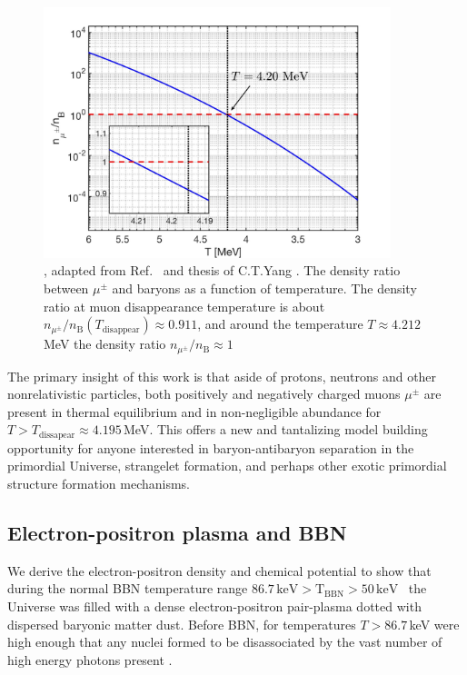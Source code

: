 \begin{figure}
\centerline{\includegraphics[width=0.9\textwidth]{./plots/DensityRatio_new2.jpg}}
\caption{, adapted from Ref.~\cite{Rafelski:2021aey} and thesis of C.T.Yang \cite{Yang:2024ret}.
The density ratio between $\mu^\pm$ and baryons as a function of temperature. The density ratio at muon disappearance temperature is about $n_{\mu^\pm}/n_\mathrm{B}(T_\mathrm{disappear})\approx0.911$, and around the temperature $T\approx4.212$ MeV the density ratio $n_{\mu^\pm}/n_\mathrm{B}\approx1$}
\label{fig:DensityRatio}
\end{figure}

The primary insight of this work is that aside of protons, neutrons and other nonrelativistic particles, both positively and negatively charged muons $\mu^\pm$ are present in thermal equilibrium and in non-negligible abundance for $T>T_\mathrm{dissapear}\approx 4.195$\,MeV. This offers a new and tantalizing model building opportunity for anyone interested in baryon-antibaryon separation in the primordial Universe, strangelet formation, and perhaps other exotic primordial structure formation mechanisms.






\subsection{Electron-positron plasma and BBN}
\label{sec:density}

We derive the electron-positron density and chemical potential to show that during the normal BBN temperature range $86.7\,\mathrm{keV}>\mathrm{T_{BBN}}>50\,\mathrm{keV}$~\cite{Pitrou:2018cgg} the Universe was filled with a dense electron-positron pair-plasma dotted with dispersed baryonic matter dust.  Before BBN, for temperatures $T>86.7\,$keV were high enough that any nuclei formed to be disassociated by the vast number of high energy photons present \cite{Pitrou:2018cgg}. 

